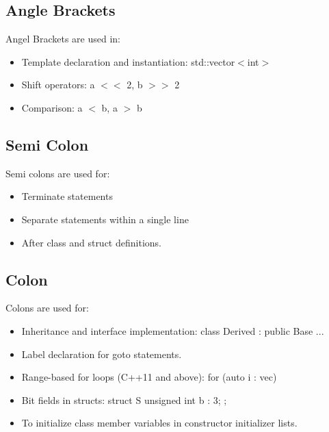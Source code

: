 \documentclass{report}
\begin{document}
    \begin{minipage}[t]{0.67\textwidth}
    \subsection{Angle Brackets}
    \bigbreak \noindent 
    Angel Brackets are used in:
    \begin{itemize}
        \item Template declaration and instantiation: std::vector$<$int$>$
        \item Shift operators: a $<<$ 2, b $>>$ 2
        \item Comparison: a $<$ b, a $>$ b
    \end{itemize}
    \end{minipage}
    \bigbreak \noindent \bigbreak \noindent
    \begin{minipage}[t]{0.47\textwidth}
    \subsection{Semi Colon}
    \bigbreak \noindent 
    Semi colons are used for:
    \begin{itemize}
        \item Terminate statements 
        \item Separate statements within a single line
        \item After class and struct definitions.
    \end{itemize}
    \end{minipage}
    \begin{minipage}[t]{0.47\textwidth}
    \subsection{Colon}
    \bigbreak \noindent 
    Colons are used for:
    \begin{itemize}
        \item Inheritance and interface implementation: class Derived : public Base { ... }
        \item Label declaration for goto statements.
        \item Range-based for loops (C++11 and above): for (auto i : vec)
        \item Bit fields in structs: struct S { unsigned int b : 3; };
        \item To initialize class member variables in constructor initializer lists.
    \end{itemize}
    \end{minipage}
\end{document}

